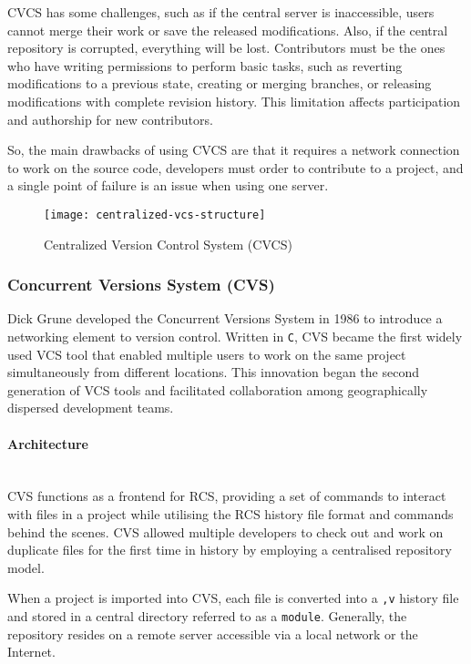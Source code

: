 CVCS has some challenges, such as if the central server is inaccessible, users cannot merge their work or save the released modifications. Also, if the central repository is corrupted, everything will be lost. Contributors must be the ones who have writing permissions to perform basic tasks, such as reverting modifications to a previous state, creating or merging branches, or releasing modifications with complete revision history. This limitation affects participation and authorship for new contributors.
\smallskip

So, the main drawbacks of using CVCS are that it requires a network connection to work on the source code, developers must order to contribute to a project, and a single point of failure is an issue when using one server.

\begin{figure}[htbp]
    \centering
    \texttt{[image: centralized-vcs-structure]}
    \caption{Centralized Version Control System (CVCS)}
    \label{fig:cvcs-structure}
\end{figure}

\subsubsection{Concurrent Versions System (CVS)}
\label{sec:cvs}
Dick Grune developed the Concurrent Versions System in 1986 to introduce a networking element to version control. Written in \lstinline{C}, CVS became the first widely used VCS tool that enabled multiple users to work on the same project simultaneously from different locations. This innovation began the second generation of VCS tools and facilitated collaboration among geographically dispersed development teams.
\paragraph{Architecture}
\hfill\medskip\\
CVS functions as a frontend for RCS, providing a set of commands to interact with files in a project while utilising the RCS history file format and commands behind the scenes. CVS allowed multiple developers to check out and work on duplicate files for the first time in history by employing a centralised repository model.
\smallskip

When a project is imported into CVS, each file is converted into a \lstinline{,v} history file and stored in a central directory referred to as a \lstinline{module}\cite{stopak_2019}. Generally, the repository resides on a remote server accessible via a local network or the Internet.
\smallskip

